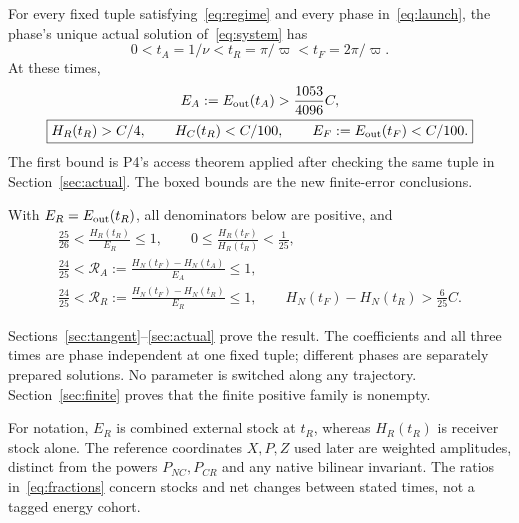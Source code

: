 \begin{theorem}\label{thm:episode}
For every fixed tuple satisfying~\eqref{eq:regime} and every phase in~\eqref{eq:launch}, the phase's unique actual solution of~\eqref{eq:system} has
\begin{equation}\label{eq:times}%
 0<t_A=1/\nu<t_R=\pi/\varpi<t_F=2\pi/\varpi .
\end{equation}
At these times,
\begin{equation}\label{eq:episode}%
\begin{gathered}
 E_A:=E_{\rm out}(t_A)>\frac{1053}{4096}C,\\
 \boxed{H_R(t_R)>C/4,\qquad H_C(t_R)<C/100,\qquad
 E_F:=E_{\rm out}(t_F)<C/100.}
\end{gathered}
\end{equation}
The first bound is P4's access theorem applied after checking the same tuple in Section~\ref{sec:actual}. The boxed bounds are the new finite-error conclusions.

With $E_R=E_{\rm out}(t_R)$, all denominators below are positive, and
\begin{equation}\label{eq:fractions}%
\begin{gathered}
 \frac{25}{26}<\frac{H_R(t_R)}{E_R}\le1,\qquad
 0\le\frac{H_R(t_F)}{H_R(t_R)}<\frac1{25},\\
 \frac{24}{25}<
 \mathcal R_A:=\frac{H_N(t_F)-H_N(t_A)}{E_A}\le1,\\
 \frac{24}{25}<
 \mathcal R_R:=\frac{H_N(t_F)-H_N(t_R)}{E_R}\le1,\qquad
 H_N(t_F)-H_N(t_R)>\frac6{25}C .
\end{gathered}
\end{equation}
\end{theorem}
Sections~\ref{sec:tangent}--\ref{sec:actual} prove the result. The coefficients and all three times are phase independent at one fixed tuple; different phases are separately prepared solutions. No parameter is switched along any trajectory. Section~\ref{sec:finite} proves that the finite positive family is nonempty.

For notation, $E_R$ is combined external stock at $t_R$, whereas $H_R(t_R)$ is receiver stock alone. The reference coordinates $X,P,Z$ used later are weighted amplitudes, distinct from the powers $P_{NC},P_{CR}$ and any native bilinear invariant. The ratios in~\eqref{eq:fractions} concern stocks and net changes between stated times, not a tagged energy cohort.
